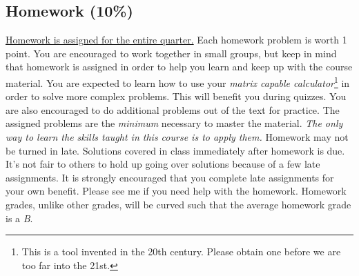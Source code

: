 \documentclass[10pt]{article}
\begin{document}

\subsection*{Homework (10\%)}
\href{http://www.cs.wright.edu/~jslater/classes/statics/homework.shtml}{Homework is assigned for the entire quarter.}  Each homework problem is worth 1 point.  You are encouraged to work together in small groups, but keep in mind that homework is assigned in order to help you learn and keep up with the course material.  You are expected to learn how to use your \emph{matrix capable calculator}\footnote{This is a tool invented in the 20th century. Please obtain one before we are too far into the 21st.} in order to solve more complex problems.  This will benefit you during quizzes.  You are also encouraged to do additional problems out of the text for practice.  The assigned problems are the \emph{minimum} necessary to master the material.  \emph{The only way to learn the skills taught in this course is to apply them.} Homework may not be turned in late.  Solutions covered in class immediately after homework is due.  It's not fair to others to hold up going over solutions because of a few late assignments.  It is strongly encouraged that you complete late assignments for your own benefit.  Please see me if you need help with the homework.  Homework grades, unlike other grades,  will be curved such that the average homework grade is a \emph{B}.
\end{document}

